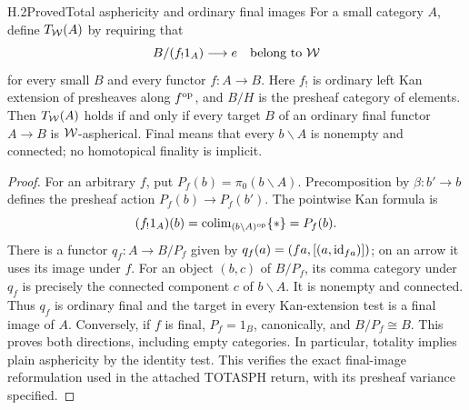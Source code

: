 \begin{claim}{H.2}{Proved}{Total asphericity and ordinary final images}
For a small category $A$, define $T_{\mathcal{W}}(A)$ by requiring that
\[
 B/(f_!1_A)\longrightarrow e\quad\text{belong to }\mathcal{W}
\]
for every small $B$ and every functor $f:A\to B$. Here $f_!$ is ordinary left Kan extension of presheaves along $f^{\mathrm{op}}$, and $B/H$ is the presheaf category of elements. Then $T_{\mathcal{W}}(A)$ holds if and only if every target $B$ of an ordinary final functor $A\to B$ is $\mathcal{W}$-aspherical. Final means that every $b\backslash A$ is nonempty and connected; no homotopical finality is implicit.
\end{claim}
\begin{proof}
For an arbitrary $f$, put $P_f(b)=\pi_0(b\backslash A)$. Precomposition by $\beta:b'\to b$ defines the presheaf action $P_f(b)\to P_f(b')$. The pointwise Kan formula is
\[
 (f_!1_A)(b)=\operatorname{colim}_{(b\backslash A)^{\mathrm{op}}}\{*\}=P_f(b).
\]
There is a functor $q_f:A\to B/P_f$ given by
$q_f(a)=(fa,[(a,\mathrm{id}_{fa})])$; on an arrow it uses its image under $f$. For an object $(b,c)$ of $B/P_f$, its comma category under $q_f$ is precisely the connected component $c$ of $b\backslash A$. It is nonempty and connected. Thus $q_f$ is ordinary final and the target in every Kan-extension test is a final image of $A$. Conversely, if $f$ is final, $P_f=1_B$, canonically, and $B/P_f\cong B$. This proves both directions, including empty categories. In particular, totality implies plain asphericity by the identity test. This verifies the exact final-image reformulation used in the attached TOTASPH return, with its presheaf variance specified.
\end{proof}

